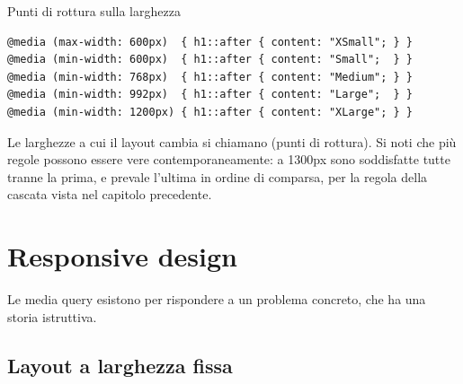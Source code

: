 \begin{esempio}{Punti di rottura sulla larghezza}
\begin{lstlisting}[style=css, name=breakpoint.css]
@media (max-width: 600px)  { h1::after { content: "XSmall"; } }
@media (min-width: 600px)  { h1::after { content: "Small";  } }
@media (min-width: 768px)  { h1::after { content: "Medium"; } }
@media (min-width: 992px)  { h1::after { content: "Large";  } }
@media (min-width: 1200px) { h1::after { content: "XLarge"; } }
\end{lstlisting}

\begin{center}
\end{center}

Le larghezze a cui il layout cambia si chiamano  (punti di
rottura). Si noti che più regole possono essere vere contemporaneamente: a
1300px sono soddisfatte tutte tranne la prima, e prevale l'ultima in ordine di
comparsa, per la regola della cascata vista nel capitolo precedente.
\end{esempio}

\section{Responsive design}

Le media query esistono per rispondere a un problema concreto, che ha una storia
istruttiva.

\subsection{Layout a larghezza fissa}

